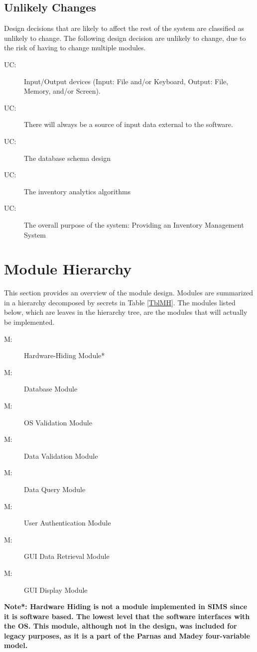 \documentclass[12pt, titlepage]{article}
\newcounter{ucnum}
\newcommand{\uctheucnum}{UC\theucnum}
\newcounter{mnum}
\newcommand{\mthemnum}{M\themnum}
\begin{document}
\subsection{Unlikely Changes} \label{SecUchange}

Design decisions that are likely to affect the rest of the system are classified as unlikely to change. The following design decision are unlikely to change, due to the risk of having to change multiple modules.

\begin{description}
\item[ \uctheucnum \label{ucIO}:] Input/Output devices (Input: File and/or Keyboard, Output: File, Memory, and/or Screen).
\item[ \uctheucnum \label{ucInput1}:] There will always be a source of input data external to the software.
\item[ \uctheucnum \label{ucInput2}:] The database schema design
\item[ \uctheucnum \label{ucInput3}:] The inventory analytics algorithms
\item[ \uctheucnum \label{ucInput4}:] The overall purpose of the system: Providing an Inventory Management System
\end{description}

\section{Module Hierarchy} \label{SecMH}

This section provides an overview of the module design. Modules are summarized
in a hierarchy decomposed by secrets in Table \ref{TblMH}. The modules listed
below, which are leaves in the hierarchy tree, are the modules that will
actually be implemented.

\begin{description}
\item [ \mthemnum \label{mH1}:] Hardware-Hiding Module*
\item [ \mthemnum \label{mH2}:] Database Module
\item [ \mthemnum \label{mH3}:] OS Validation Module
\item [ \mthemnum \label{mH4}:] Data Validation Module
\item [ \mthemnum \label{mH5}:] Data Query Module
\item [ \mthemnum \label{mH6}:] User Authentication Module
\item [ \mthemnum \label{mH7}:] GUI Data Retrieval Module
\item [ \mthemnum \label{mH8}:] GUI Display Module
\end{description}
\textbf{Note*: Hardware Hiding is not a module implemented in SIMS since it is software based. The lowest level that the software interfaces with the OS. This module, although not in the design, was included for legacy purposes, as it is a part of the Parnas and Madey four-variable model.}
\end{document}
